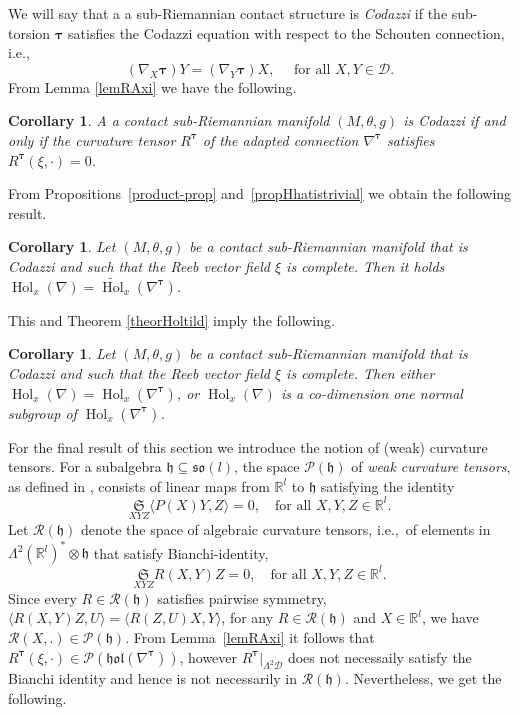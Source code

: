 \documentclass{amsart}
\theoremstyle{plain}
\newtheorem{cor}[theorem]{Corollary}
\theoremstyle{definition}
\newcommand{\Hol}{\operatorname{Hol}}
\def\R{\mathcal{R}}
\def\P{\mathcal{P}}
\def\so{\mathfrak{so}}
\newcommand{\h}{\mathfrak{h}}
\newcommand{\hol}{\mathfrak{hol}}
\newcommand{\bt}{{\boldsymbol{\tau}}}
\newcommand{\Real}{\mathbb{R}}
\newcommand{\Su}{\mathfrak{S}}
\newcommand{\1}{\mathbf{1}}
\newcommand{\D}{{\mathcal D}}
\newcommand{\+}{\oplus}
\begin{document}
We will say that a
a sub-Riemannian contact structure is {\em Codazzi} if the sub-torsion $\bt$ satisfies the Codazzi equation with respect to the Schouten connection, i.e.,
\[(\nabla_X\bt)Y=(\nabla_Y\bt )X,\quad\text{ for all $X,Y\in \D$.}\]
From Lemma \ref{lemRAxi} we have the following.

\begin{cor} A  a contact sub-Riemannian manifold  $(M,\theta,g)$ is Codazzi if and only if  the curvature tensor $R^\bt$ of the adapted connection $\nabla^\bt$ satisfies 
	$R^\bt(\xi,\cdot)=0$.
\end{cor}

From Propositions~\ref{product-prop} and~\ref{propHhatistrivial} we obtain the following result.

\begin{cor} Let $(M,\theta,g)$ be a contact sub-Riemannian manifold that is Codazzi and such that the Reeb vector field $\xi$ is complete. Then it holds
$\Hol_x(\nabla)=\widetilde{\Hol}_x(\nabla^\bt)$.
\end{cor}

This and Theorem \ref{theorHoltild} imply the following.

\begin{cor}\label{cordech}
Let $(M,\theta,g)$ be a contact sub-Riemannian manifold that is Codazzi and such that the Reeb vector field $\xi$ is complete. Then either ${\Hol}_x(\nabla)={\Hol}_x(\nabla^\bt)$, or ${\Hol}_x(\nabla)$ is a co-dimension one  normal subgroup of  ${\Hol}_x(\nabla^\bt)$.
\end{cor}
For the final result of this section we introduce the notion of (weak) curvature tensors. 
For a subalgebra $\h\subseteq\so(l)$, the space $\P(\h)$ of {\em weak curvature tensors}, as defined in \cite{Leistner}, consists of linear maps from $\Real^l$ to $\h$ satisfying the identity
$$\underset{X Y Z}{\Su}\langle P(X)Y,Z\rangle =0,  \quad\text{for all } X,Y,Z\in\Real^l.$$
Let $\R(\h)$ 
denote the space of algebraic curvature tensors, i.e.,~of elements in $\Lambda^2 (\Real^l)^*\otimes \h$ that satisfy Bianchi-identity, 
$$\underset{X Y Z}{\Su}R(X,Y)Z=0,  \quad\text{for all } X,Y,Z\in\Real^l.$$
Since every $R\in \R(\h)$ satisfies pairwise symmetry, $\langle R(X,Y)Z,U\rangle=\langle R(Z,U)X,Y\rangle$, for
any  $R\in\R(\h)$ and  $X\in \Real^l$, we have $\R(X,.)\in \P(\h)$. 
From Lemma~\ref{lemRAxi} it follows that $R^\bt(\xi,\cdot)\in \P(\hol(\nabla^\bt))$, however 
$R^\bt |_{\Lambda^2\D}$ does not necessaily satisfy the Bianchi identity and hence is  not necessarily in $\R(\h)$. Nevertheless, we get the following.
\end{document}

